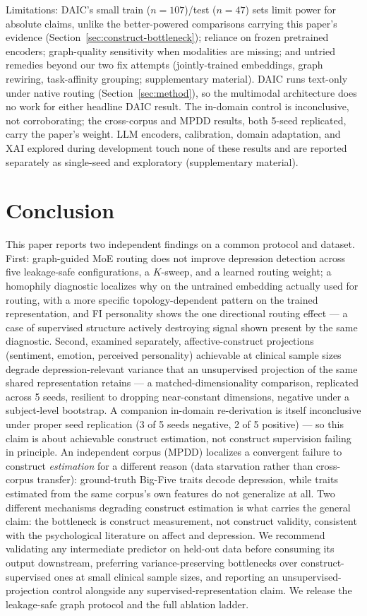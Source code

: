 \documentclass[letterpaper]{article}
\begin{document}
Limitations: DAIC's small train ($n{=}107$)/test ($n{=}47$) sets limit power for absolute claims, unlike the better-powered comparisons carrying this paper's evidence (Section~\ref{sec:construct-bottleneck}); reliance on frozen pretrained encoders; graph-quality sensitivity when modalities are missing; and untried remedies beyond our two fix attempts (jointly-trained embeddings, graph rewiring, task-affinity grouping; supplementary material). DAIC runs text-only under native routing (Section~\ref{sec:method}), so the multimodal architecture does no work for either headline DAIC result. The in-domain control is inconclusive, not corroborating; the cross-corpus and MPDD results, both 5-seed replicated, carry the paper's weight. LLM encoders, calibration, domain adaptation, and XAI explored during development touch none of these results and are reported separately as single-seed and exploratory (supplementary material).

\section{Conclusion}

This paper reports two independent findings on a common protocol and dataset. First: graph-guided MoE routing does not improve depression detection across five leakage-safe configurations, a $K$-sweep, and a learned routing weight; a homophily diagnostic localizes why on the untrained embedding actually used for routing, with a more specific topology-dependent pattern on the trained representation, and FI personality shows the one directional routing effect — a case of supervised structure actively destroying signal shown present by the same diagnostic. Second, examined separately, affective-construct projections (sentiment, emotion, perceived personality) achievable at clinical sample sizes degrade depression-relevant variance that an unsupervised projection of the same shared representation retains — a matched-dimensionality comparison, replicated across 5 seeds, resilient to dropping near-constant dimensions, negative under a subject-level bootstrap. A companion in-domain re-derivation is itself inconclusive under proper seed replication (3 of 5 seeds negative, 2 of 5 positive) — so this claim is about achievable construct estimation, not construct supervision failing in principle. An independent corpus (MPDD) localizes a convergent failure to construct \emph{estimation} for a different reason (data starvation rather than cross-corpus transfer): ground-truth Big-Five traits decode depression, while traits estimated from the same corpus's own features do not generalize at all. Two different mechanisms degrading construct estimation is what carries the general claim: the bottleneck is construct measurement, not construct validity, consistent with the psychological literature on affect and depression. We recommend validating any intermediate predictor on held-out data before consuming its output downstream, preferring variance-preserving bottlenecks over construct-supervised ones at small clinical sample sizes, and reporting an unsupervised-projection control alongside any supervised-representation claim. We release the leakage-safe graph protocol and the full ablation ladder.


\end{document}
